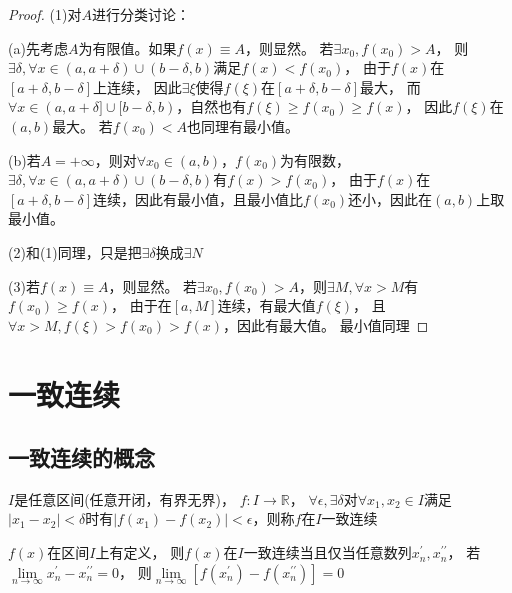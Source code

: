\begin{proof}
  (1)对$A$进行分类讨论：

  (a)先考虑$A$为有限值。如果$f(x) \equiv A$，则显然。
  若$\exists x_0, f(x_0) > A$， 则$\exists \delta, \forall x \in (a, a+\delta) \cup (b-\delta,b)$满足$f(x) < f(x_0)$，
  由于$f(x)$在$[a+\delta,b-\delta]$上连续，
  因此$\exists \xi$使得$f(\xi)$在$[a+\delta,b-\delta]$最大，
  而$\forall x \in (a, a+\delta] \cup [b-\delta,b)$，自然也有$f(\xi) \geq f(x_0) \geq f(x)$，
  因此$f(\xi)$在$(a,b)$最大。
  若$f(x_0) < A$也同理有最小值。

  (b)若$A = +\infty$，则对$\forall x_0 \in (a,b)$，$f(x_0)$为有限数，
  $\exists \delta, \forall x \in (a, a+ \delta) \cup (b-\delta, b)$有$f(x) > f(x_0)$，
  由于$f(x)$在$[a+\delta,b-\delta]$连续，因此有最小值，且最小值比$f(x_0)$还小，因此在$(a,b)$上取最小值。

  (2)和(1)同理，只是把$\exists \delta$换成$\exists N$

  (3)若$f(x) \equiv A$，则显然。
  若$\exists x_0, f(x_0) > A$，则$\exists M, \forall x > M$有$f(x_0) \geq f(x)$，
  由于在$[a,M]$连续，有最大值$f(\xi)$，
  且$\forall x >M, f(\xi) > f(x_0) > f(x)$，因此有最大值。
  最小值同理
\end{proof}



\section{一致连续}

\subsection{一致连续的概念}

\begin{definition}[一致连续]
  $I$是任意区间(任意开闭，有界无界)，
  $f: I \rightarrow \mathbb{R}$，
  $\forall \epsilon , \exists \delta$对$\forall x_1,x_2 \in I$满足$|x_1 - x_2| < \delta$时有$|f(x_1) - f(x_2)| < \epsilon$，则称$f$在$I$一致连续
\end{definition}

\begin{theorem}[常用充要条件]
  $f(x)$在区间$I$上有定义，
  则$f(x)$在$I$一致连续当且仅当任意数列$x_n^{\prime},x_n^{\prime\prime}$，
  若$\lim \limits _{n \rightarrow \infty} x_n^{\prime} - x_n^{\prime\prime} = 0$，
  则$\lim \limits _{n \rightarrow \infty} [f(x_n^{\prime}) - f(x_n^{\prime\prime})] = 0$
\end{theorem}

